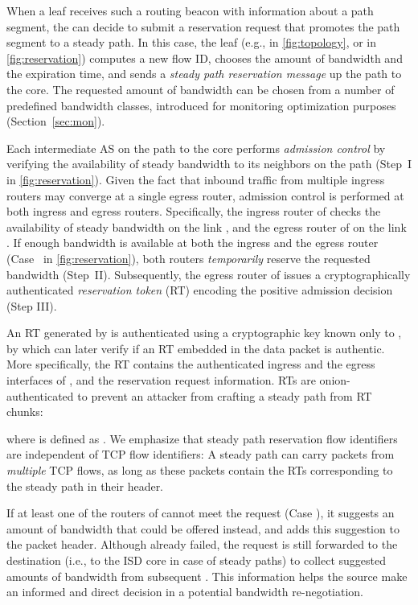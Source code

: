 \fi
When a leaf \AD receives such a routing beacon with information about
a path segment, the \AD can decide to submit a reservation request
that promotes the path segment to a steady path. In this case, the
leaf \AD (e.g.,  in \autoref{fig:topology}, or  in
\autoref{fig:reservation}) computes a new flow ID, chooses the amount
of bandwidth and the expiration time, and sends a \emph{steady path
reservation message} up the path to the core. 
The requested amount of bandwidth can be chosen from a number of predefined
bandwidth classes, introduced for monitoring optimization purposes
(Section~\ref{sec:mon}).

Each intermediate AS on the path to the core performs \textit{admission
control} by verifying the availability of steady bandwidth to its
neighbors on the path (Step~I in \autoref{fig:reservation}). Given
the fact that inbound traffic from multiple ingress routers may
converge at a single egress router, admission control is performed at
both ingress and egress routers. Specifically, the ingress router of
 checks the availability of steady bandwidth on the link
, and the egress router of  on the
link .
If enough bandwidth is available at both the ingress and the egress
router (Case~ in \autoref{fig:reservation}), both routers
\textit{temporarily} reserve the requested bandwidth (Step~II).
Subsequently, the egress router of  issues a cryptographically
authenticated \textit{reservation token} (RT) encoding the positive
admission decision (Step III).

An RT generated by  is authenticated using a cryptographic key
 known only to , by which  can later verify if an RT
embedded in the data packet is authentic.
More specifically, the RT contains the authenticated ingress and the
egress interfaces of , and the reservation request information.
RTs are onion-authenticated to prevent an attacker from crafting a
steady path from RT chunks:

\vspace{-12pt}

where  is defined as
.
We emphasize that steady path reservation flow identifiers are independent of
TCP flow identifiers: A steady path can carry packets from \emph{multiple} TCP
flows, as long as these packets contain the RTs corresponding to the steady
path in their header.


If at least one of the routers of  cannot meet the request
(Case ), it suggests an amount of bandwidth that could be
offered instead, and adds this suggestion to the packet header.
Although already failed, the request is still forwarded to the
destination (i.e., to the ISD core in case of steady paths) to collect
suggested amounts of bandwidth from subsequent
\ADs. This information helps the source make an informed and direct
decision in a potential bandwidth re-negotiation.

